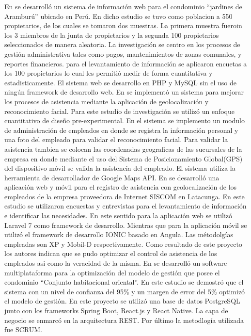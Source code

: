 \bigbreak
En\cite{portugalSistemaInformacionPara2022} se desarrolló un sistema de información web para el condominio {\textquotedblleft}jardines de Aramburú{\textquotedblright} ubicado en Perú. En dicho estudio se tuvo como poblacion a 550 propietarios, de los cuales se tomaron dos muestras. La primera muestra fueroin los 3 miembros de la junta de propietarios y la segunda 100 propietarios seleccionados de manera aleatoria. La investigación se centro en los procesos de gestión administrativa tales como pagos, mantenimientos de zonas comunales, y reportes financieros. para el levantamiento de información se aplicaron encuetas a los 100 propietarios lo cual les permitió medir de forma cuantitativa y estadisticamente. El sistema web se desarrollo en PHP y MySQL sin el uso de ningún framework de desarrollo web.
\bigbreak
En\cite{castroReconocimientoFacialGeolocalizacion2023} se implementó un sistema para mejorar los procesos de asistencia mediante la aplicación de geolocalización y reconocimiento facial. Para este estudio de investigación se utilizó un enfoque cuantitativo de diseño pre-experimental. En el sistema se implemento un modulo de administración de empleados en donde se registra la información personal y una foto del empleado para validar el reconocimiento facial. Para validar la asistencia tambien se colocan las coordenadas geograficas de las sucursales de la empresa en donde mediante el uso del Sistema de Posicionamiento Global(GPS) del dispositivo móvil se valida la asistencia del empleado. El sistema utiliza la herramienta de desarrollador de Google Maps API.
\bigbreak
En\cite{izaDesarrolloERPPara2023} se desarrolló una aplicación web y móvil para el registro de asistencia con geolocalización de los empleados de la empresa proveedora de Internet SISCOM en Latacunga. En este estudio se utilizaron encuestas y entrevistas para el levantamiento de información e identificar las necesidades. En este sentido para la aplicación web se utilizó Laravel 7 como framework de desarrollo. Mientras que para la aplicación móvil se utilizó el framework de desarrollo IONIC basado en Angula. Las métodolgías empleadas son XP y Mobil-D respectivamente. Como resultado de este proyecto los autores indican que se pudo optimizar el control de asistencia de los empleados asi como la veracidad de la misma.
\bigbreak
En\cite{montalvoDesarrolloSistemaSoftware2023} se desarrolló un software multiplataforma para la optimización del modelo de gestión que posee el condominio {\textquotedblleft}Conjunto habitacional oriental{\textquotedblright}. En este estudio se demostró que el sistema con un nivel de confianza del 95\% y un margen de error del 5\% optimizó el modelo de gestión. En este proyecto se utilizó una base de datos PostgreSQL junto con los frameworks Spring Boot, React.js y React Native. La capa de negocio se enmarcó en la arquitectura REST. Por último la metodlogía utilizada fue SCRUM.